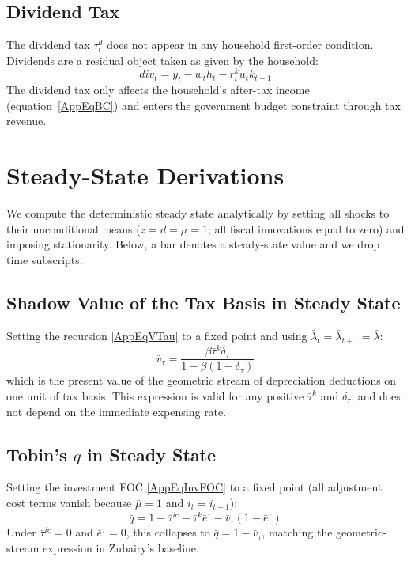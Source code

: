 \subsection{Dividend Tax}

The dividend tax $\tau_t^d$ does not appear in any household first-order condition. Dividends are a residual object taken as given by the household:
\begin{equation}\label{AppEqDiv}
    div_t = y_t - w_t h_t - r_t^k u_t k_{t-1}
\end{equation}
The dividend tax only affects the household's after-tax income (equation~\ref{AppEqBC}) and enters the government budget constraint through tax revenue.

\newpage

\section{Steady-State Derivations}
\label{AppSSDerivations}

We compute the deterministic steady state analytically by setting all shocks to their unconditional means ($z = d = \mu = 1$; all fiscal innovations equal to zero) and imposing stationarity. Below, a bar denotes a steady-state value and we drop time subscripts.

\subsection{Shadow Value of the Tax Basis in Steady State}

Setting the recursion \eqref{AppEqVTau} to a fixed point and using $\bar{\lambda}_t = \bar{\lambda}_{t+1} = \bar{\lambda}$:
\begin{equation}\label{AppEqSSvtau}
    \bar{v}_\tau = \frac{\beta \bar{\tau}^k \delta_\tau}{1 - \beta(1 - \delta_\tau)}
\end{equation}
which is the present value of the geometric stream of depreciation deductions on one unit of tax basis. This expression is valid for any positive $\bar{\tau}^k$ and $\delta_\tau$, and does not depend on the immediate expensing rate.

\subsection{Tobin's $q$ in Steady State}

Setting the investment FOC \eqref{AppEqInvFOC} to a fixed point (all adjustment cost terms vanish because $\bar{\mu} = 1$ and $\bar{i}_t = \bar{i}_{t-1}$):
\begin{equation}\label{AppEqSSq}
    \bar{q} = 1 - \bar{\tau}^{ic} - \bar{\tau}^k \bar{e}^\tau - \bar{v}_\tau (1 - \bar{e}^\tau)
\end{equation}
Under $\bar{\tau}^{ic} = 0$ and $\bar{e}^\tau = 0$, this collapses to $\bar{q} = 1 - \bar{v}_\tau$, matching the geometric-stream expression in Zubairy's baseline.

